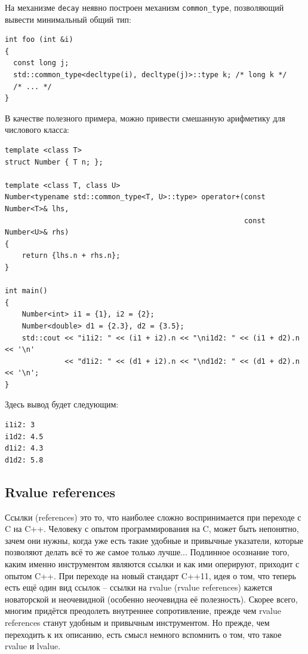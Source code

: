 \documentclass[a4paper,12pt,oneside]{article}
\begin{document}
На механизме \lstinline!decay! неявно построен механизм \lstinline!common_type!, позволяющий вывести минимальный общий тип:

\begin{lstlisting}
int foo (int &i)
{
  const long j;
  std::common_type<decltype(i), decltype(j)>::type k; /* long k */
  /* ... */
}
\end{lstlisting}

В качестве полезного примера, можно привести смешанную арифметику для числового класса:

\begin{lstlisting}
template <class T>
struct Number { T n; };
 
template <class T, class U>
Number<typename std::common_type<T, U>::type> operator+(const Number<T>& lhs,
                                                        const Number<U>& rhs) 
{
    return {lhs.n + rhs.n};
}
 
int main()
{
    Number<int> i1 = {1}, i2 = {2};
    Number<double> d1 = {2.3}, d2 = {3.5};
    std::cout << "i1i2: " << (i1 + i2).n << "\ni1d2: " << (i1 + d2).n << '\n'
              << "d1i2: " << (d1 + i2).n << "\nd1d2: " << (d1 + d2).n << '\n';
}
\end{lstlisting}

Здесь вывод будет следующим:

\begin{lstlisting}
i1i2: 3
i1d2: 4.5
d1i2: 4.3
d1d2: 5.8
\end{lstlisting}

\subsection{Rvalue references}

Ссылки (references) это то, что наиболее сложно воспринимается при переходе с C на C++. Человеку с опытом программирования на C, может быть непонятно, зачем они нужны, когда уже есть такие удобные и привычные указатели, которые позволяют делать всё то же самое только лучше... Подлинное осознание того, каким именно инструментом являются ссылки и как ими оперируют, приходит с опытом C++. При переходе на новый стандарт C++11, идея о том, что теперь есть ещё один вид ссылок -- ссылки на rvalue (rvalue references) кажется новаторской и неочевидной (особенно неочевидна её полезность). Скорее всего, многим придётся преодолеть внутреннее сопротивление, прежде чем rvalue references станут удобным и привычным инструментом. Но прежде, чем переходить к их описанию, есть смысл немного вспомнить о том, что такое rvalue и lvalue.
\end{document}

